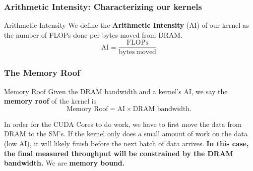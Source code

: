 \documentclass[../main.tex]{subfiles}
\begin{document}
\begin{frame}
  \frametitle{Arithmetic Intensity: Characterizing our kernels}

  \begin{block}{Arithmetic Intensity}
    We define the \textbf{Arithmetic Intensity} (AI) of our kernel as the
    number of FLOPs done per bytes moved from DRAM.
    \[
      \mathrm{AI}=\frac{\mathrm{FLOPs}}{\mathrm{bytes\ moved}}
    \]
  \end{block}

  \pause

\end{frame}

\begin{frame}
  \frametitle{The Memory Roof}
  \begin{block}{Memory Roof}
    Given the DRAM bandwidth and a kernel's AI, we say the \textbf{memory roof}
    of the kernel is
    \[\text{Memory Roof} = \text{AI} \times \text{DRAM bandwidth}.\]
  \end{block}

  \pause
  \begin{example}[Intuition]
    In order for the CUDA Cores to do work, we have
    to first move the data from DRAM to the SM's. \pause If the kernel only does a
    small amount of work on the data (low AI), it will likely finish before the
    next batch of data arrives. \pause \textbf{In this case, the final measured
    throughput will be constrained by the DRAM bandwidth.} We are \textbf{memory bound.}
  \end{example}

\end{frame}
\end{document}
